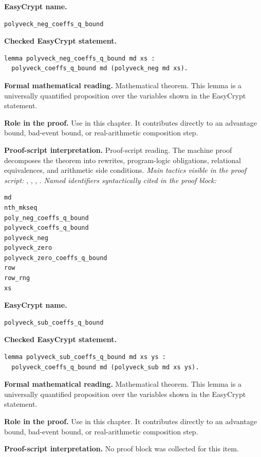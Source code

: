 \begin{formaltheorem}
\noindent\textbf{EasyCrypt name.}
\begin{lstlisting}[language=EasyCrypt,basicstyle=\ttfamily\scriptsize]
polyveck_neg_coeffs_q_bound
\end{lstlisting}
\noindent\textbf{Checked EasyCrypt statement.}
\begin{lstlisting}[language=EasyCrypt,basicstyle=\ttfamily\scriptsize]
lemma polyveck_neg_coeffs_q_bound md xs :
  polyveck_coeffs_q_bound md (polyveck_neg md xs).
\end{lstlisting}
\noindent\textbf{Formal mathematical reading.}
Mathematical theorem. This lemma is a universally quantified proposition over the variables shown in the EasyCrypt statement.

\noindent\textbf{Role in the proof.}
Use in this chapter. It contributes directly to an advantage bound, bad-event bound, or real-arithmetic composition step.

\noindent\textbf{Proof-script interpretation.}
Proof-script reading. The machine proof decomposes the theorem into rewrites, program-logic obligations, relational equivalences, and arithmetic side conditions.
\emph{Main tactics visible in the proof script:} , , , .
\emph{Named identifiers syntactically cited in the proof block:}
\begin{lstlisting}[language=EasyCrypt,basicstyle=\ttfamily\scriptsize]
md
nth_mkseq
poly_neg_coeffs_q_bound
polyveck_coeffs_q_bound
polyveck_neg
polyveck_zero
polyveck_zero_coeffs_q_bound
row
row_rng
xs
\end{lstlisting}

\end{formaltheorem}

\begin{formaltheorem}
\noindent\textbf{EasyCrypt name.}
\begin{lstlisting}[language=EasyCrypt,basicstyle=\ttfamily\scriptsize]
polyveck_sub_coeffs_q_bound
\end{lstlisting}
\noindent\textbf{Checked EasyCrypt statement.}
\begin{lstlisting}[language=EasyCrypt,basicstyle=\ttfamily\scriptsize]
lemma polyveck_sub_coeffs_q_bound md xs ys :
  polyveck_coeffs_q_bound md (polyveck_sub md xs ys).
\end{lstlisting}
\noindent\textbf{Formal mathematical reading.}
Mathematical theorem. This lemma is a universally quantified proposition over the variables shown in the EasyCrypt statement.

\noindent\textbf{Role in the proof.}
Use in this chapter. It contributes directly to an advantage bound, bad-event bound, or real-arithmetic composition step.

\noindent\textbf{Proof-script interpretation.}
No proof block was collected for this item.

\end{formaltheorem}

